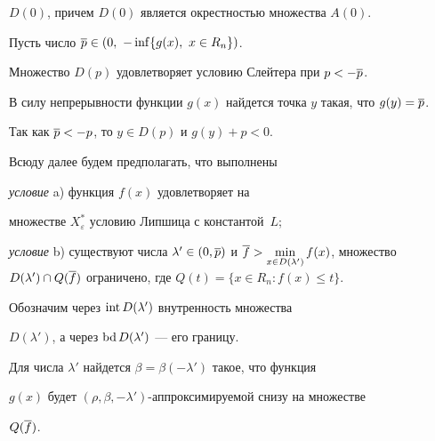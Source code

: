 $D(0)$, причем $D(0)$ является окрестностью множества $A(0)$.





Пусть число $\o p\in (0,\ -\inf\{g(x),\ x\in R_n\})$.





\begin{lem}\label{slay1}


Множество $D(p)$ удовлетворяет условию Слейтера при $p<-\overline p$.


\end{lem}





\begin{pf}


В силу непрерывности функции $g(x)$ найдется точка $y$ такая, что $g(y)=\overline p$.


Так как $\overline p<-p$, то $y\in D(p)$ и $g(y)+p<0$.


\end{pf}





Всюду далее будем предполагать, что выполнены





{\it условие} a) функция $f(x)$ удовлетворяет на 


множестве $X^*_\varepsilon$ условию Липшица с константой~$L$;





{\it условие} b) существуют числа $\lambda' \in (0, \o p)$ и $\o


f>\min\limits_{x\in D(\lambda')}f(x)$, множество $D(\lambda')\cap


Q(\o f)$ ограничено, где $Q(t)=\{x\in R_n: f(x)\leq t\}$.





Обозначим через $\operatorname{int} D(\lambda')$ внутренность множества


$D(\lambda')$, а через $\operatorname{bd} D(\lambda')$ --- его границу.





\begin{lem}\label{rho3}


Для числа $\lambda'$ найдется $\beta=\beta(-\lambda')$ такое, что функция


$g(x)$ будет $(\rho,\beta,-\lambda')$-аппроксимируемой снизу на множестве


$Q(\overline f)$.


\end{lem}





